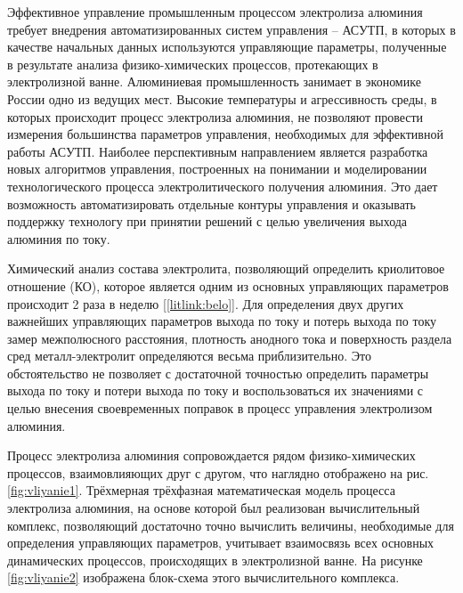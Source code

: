 \documentclass[]{pmi}
\begin{document}
\pmiemptyspace
\pmiemptyspace
{}
%


Эффективное управление промышленным процессом электролиза алюминия требует внедрения автоматизированных систем управления – АСУТП, в которых в качестве начальных данных используются управляющие параметры, полученные в результате анализа физико-химических процессов, протекающих в электролизной ванне. Алюминиевая промышленность занимает в экономике России одно из ведущих мест. Высокие температуры и агрессивность среды, в которых происходит процесс электролиза алюминия, не позволяют провести измерения большинства параметров управления, необходимых для эффективной работы АСУТП. Наиболее перспективным направлением является разработка новых алгоритмов управления, построенных на понимании и моделировании технологического процесса электролитического получения алюминия. Это дает возможность автоматизировать отдельные контуры управления и оказывать поддержку технологу при принятии решений с целью увеличения выхода алюминия по току. 

Химический анализ состава электролита, позволяющий определить криолитовое отношение (КО), которое является одним из основных управляющих параметров происходит 2 раза в неделю [\ref{litlink:belo}]. Для определения двух других важнейших управляющих параметров выхода по току и потерь выхода по току замер межполюсного расстояния, плотность анодного тока и поверхность раздела сред металл-электролит определяются весьма приблизительно. Это обстоятельство не позволяет с достаточной точностью определить параметры выхода по току и потери выхода по току и воспользоваться их значениями с целью внесения своевременных поправок в процесс управления электролизом алюминия.

Процесс электролиза алюминия сопровождается рядом физико-химических процессов, взаимовлияющих друг с другом, что наглядно отображено на рис. \ref{fig:vliyanie1}. Трёхмерная трёхфазная математическая модель процесса электролиза алюминия, на основе которой был реализован вычислительный комплекс, позволяющий достаточно точно вычислить величины, необходимые для определения управляющих параметров, учитывает взаимосвязь всех основных динамических процессов, происходящих в электролизной ванне. На рисунке \ref{fig:vliyanie2} изображена блок-схема этого вычислительного комплекса.
\end{document}
